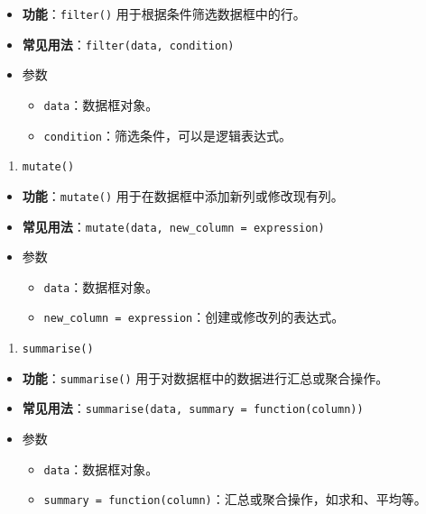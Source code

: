 \documentclass[
]{article}
\begin{document}
\begin{itemize}
\item
  \textbf{功能}：\texttt{filter()} 用于根据条件筛选数据框中的行。
\item
  \textbf{常见用法}：\texttt{filter(data,\ condition)}
\item
  参数

  \begin{itemize}
  \item
    \texttt{data}：数据框对象。
  \item
    \texttt{condition}：筛选条件，可以是逻辑表达式。
  \end{itemize}
\end{itemize}

\begin{enumerate}
\def\labelenumi{\arabic{enumi}.}
\item
  \texttt{mutate()}
\end{enumerate}

\begin{itemize}
\item
  \textbf{功能}：\texttt{mutate()} 用于在数据框中添加新列或修改现有列。
\item
  \textbf{常见用法}：\texttt{mutate(data,\ new\_column\ =\ expression)}
\item
  参数

  \begin{itemize}
  \item
    \texttt{data}：数据框对象。
  \item
    \texttt{new\_column\ =\ expression}：创建或修改列的表达式。
  \end{itemize}
\end{itemize}

\begin{enumerate}
\def\labelenumi{\arabic{enumi}.}
\item
  \texttt{summarise()}
\end{enumerate}

\begin{itemize}
\item
  \textbf{功能}：\texttt{summarise()}
  用于对数据框中的数据进行汇总或聚合操作。
\item
  \textbf{常见用法}：\texttt{summarise(data,\ summary\ =\ function(column))}
\item
  参数

  \begin{itemize}
  \item
    \texttt{data}：数据框对象。
  \item
    \texttt{summary\ =\ function(column)}：汇总或聚合操作，如求和、平均等。
  \end{itemize}
\end{itemize}
\end{document}
